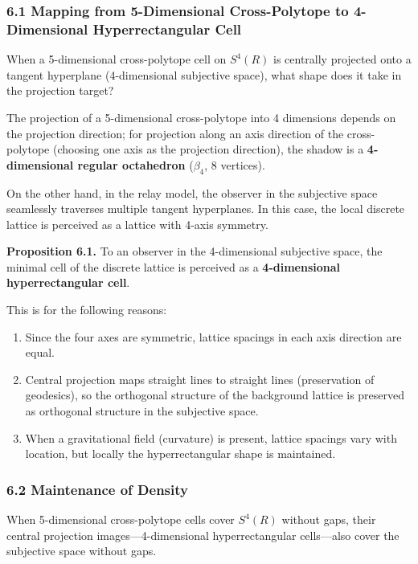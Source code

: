 \documentclass[a4paper,11pt]{article}
\providecommand{\tightlist}{\setlength{\itemsep}{0pt}\setlength{\parskip}{0pt}}
\begin{document}
\subsubsection{6.1 Mapping from 5-Dimensional Cross-Polytope to
4-Dimensional Hyperrectangular
Cell}\label{mapping-from-5-dimensional-cross-polytope-to-4-dimensional-hyperrectangular-cell}

When a 5-dimensional cross-polytope cell on \(S^4(R)\) is centrally
projected onto a tangent hyperplane (4-dimensional subjective space),
what shape does it take in the projection target?

The projection of a 5-dimensional cross-polytope into 4 dimensions
depends on the projection direction; for projection along an axis
direction of the cross-polytope (choosing one axis as the projection
direction), the shadow is a \textbf{4-dimensional regular octahedron}
(\(\beta_4\), 8 vertices).

On the other hand, in the relay model, the observer in the subjective
space seamlessly traverses multiple tangent hyperplanes. In this case,
the local discrete lattice is perceived as a lattice with 4-axis
symmetry.

\textbf{Proposition 6.1.} To an observer in the 4-dimensional subjective
space, the minimal cell of the discrete lattice is perceived as a
\textbf{4-dimensional hyperrectangular cell}.

This is for the following reasons:

\begin{enumerate}
\def\labelenumi{\arabic{enumi}.}
\tightlist
\item
  Since the four axes are symmetric, lattice spacings in each axis
  direction are equal.
\item
  Central projection maps straight lines to straight lines (preservation
  of geodesics), so the orthogonal structure of the background lattice
  is preserved as orthogonal structure in the subjective space.
\item
  When a gravitational field (curvature) is present, lattice spacings
  vary with location, but locally the hyperrectangular shape is
  maintained.
\end{enumerate}

\subsubsection{6.2 Maintenance of Density}\label{maintenance-of-density}

When 5-dimensional cross-polytope cells cover \(S^4(R)\) without gaps,
their central projection images---4-dimensional hyperrectangular
cells---also cover the subjective space without gaps.
\end{document}
